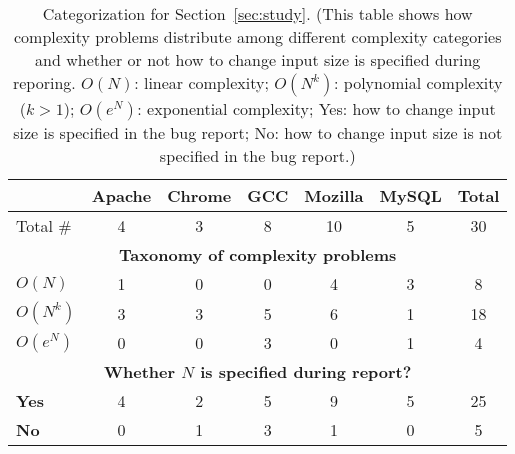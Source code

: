 \begin{table}[tb!]
\begin{adjustwidth}{-.5in}{-.5in}
\small
\centering
{
\begin{tabular}{|lcccccc|}
\hline
                                                               &   Apache  &   Chrome   &  GCC   &    Mozilla   &   MySQL  &  Total\\
\hline
Total \#                                              &   4       &    3       &   8    &    10        &   5      &   30 \\
\hline
\multicolumn{7}{|c|}{\bf Taxonomy of complexity problems}\\
\multicolumn{1}{|l}{{\bf $O(N)$}}                              &   1       &    0       &   0    &    4         &   3      &   8\\
\multicolumn{1}{|l}{{\bf $O(N^k)$}}                            &   3       &    3       &   5    &    6         &   1      &  18\\
\multicolumn{1}{|l}{{\bf $O(e^N)$}}               &   0       &    0       &   3    &    0         &   1      &   4\\
\hline
\multicolumn{7}{|c|}{\bf Whether $N$ is specified during report?}\\
\multicolumn{1}{|l}{\bf Yes}     &  4&2&5&9&5&25\\
\multicolumn{1}{|l}{\bf No}    &  0&1&3&1&0&5\\
\hline
\end{tabular}
}
\end{adjustwidth}
\caption{Categorization for Section~\ref{sec:study}.
(This table shows how complexity problems distribute among different complexity categories 
 and whether or not how to change input size is specified during reporing. $O(N)$: linear complexity;
 $O(N^k)$: polynomial complexity ($k>1$); $O(e^N)$: exponential complexity; 
 Yes: how to change input size is specified in the bug report;
 No: how to change input size is not specified in the bug report.)}
\label{tab:study}
\end{table}